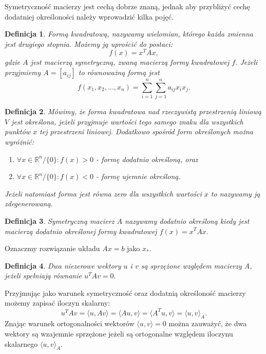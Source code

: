 \documentclass[a4paper,12pt]{book} %
\begin{document}
Symetryczność macierzy jest cechą dobrze znaną, jednak aby przybliżyć cechę dodatniej określoności należy wprowadzić kilka pojęć.

\newtheorem{df}{Definicja} 
\theoremstyle{definition}
\begin{df} 
Formą kwadratową\cite{quadratic-form}, nazywamy wielomian, którego każda zmienna jest drugiego stopnia. Możemy ją uprościć do postaci:
$$f(x) = x^TAx,$$
gdzie $A$ jest macierzą symetryczną, zwaną macierzą formy kwadratowej $f$. Jeżeli przyjmiemy $A = [a_{ij}]$ to równoważną formą jest
$$f(x_1,x_2,\ldots,x_n) = \sum_{i=1}^n\sum_{j=1}^na_{ij}x_ix_j.$$
\end{df}

\begin{df} 
Mówimy, że forma kwadratowa nad rzeczywistą przestrzenią liniową $V$ jest określona, jeżeli przyjmuje wartości tego samego znaku dla wszystkich punktów $x$ tej przestrzeni liniowej. Dodatkowo spośród form określonych można wyróżnić:
\begin{enumerate}
\item $\forall x \in \mathbb{R}^n/\{0\}: f(x) > 0$ - formę dodatnio określoną, oraz
\item $\forall x \in \mathbb{R}^n/\{0\}: f(x) < 0$ - formę ujemnie określoną.  
\end{enumerate}
Jeżeli natomiast forma jest równa zero dla wszystkich wartości $x$ to nazywamy ją zdegenerowaną.
\end{df}

\begin{df}
Symetryczną macierz $A$ nazywamy dodatnio określoną kiedy jest macierzą dodatnio określonej formy kwadratowej $f(x) = x^TAx$.
\end{df}

Oznaczmy rozwiązanie układu $Ax = b$ jako $x_*.$

\begin{df}
Dwa niezerowe wektory $u$ i $v$ są sprzężone względem macierzy A, jeżeli spełniają równanie $u^TAv = 0.$
\end{df}

Przyjmując jako warunek symetryczność oraz dodatnią określoność macierzy możemy zapisać iloczyn skalarny:
$$u^TAv = \langle u,Av\rangle = \langle Au, v \rangle = \langle A^Tu, v \rangle = \langle u, v \rangle_A.$$
Znając warunek ortogonalności wektorów $\langle u, v\rangle = 0$ można zauważyć, że dwa wektory są wzajemnie sprzężone jeżeli są ortogonalne względem iloczynu skalarnego $\langle u, v \rangle_A.$
\end{document}
